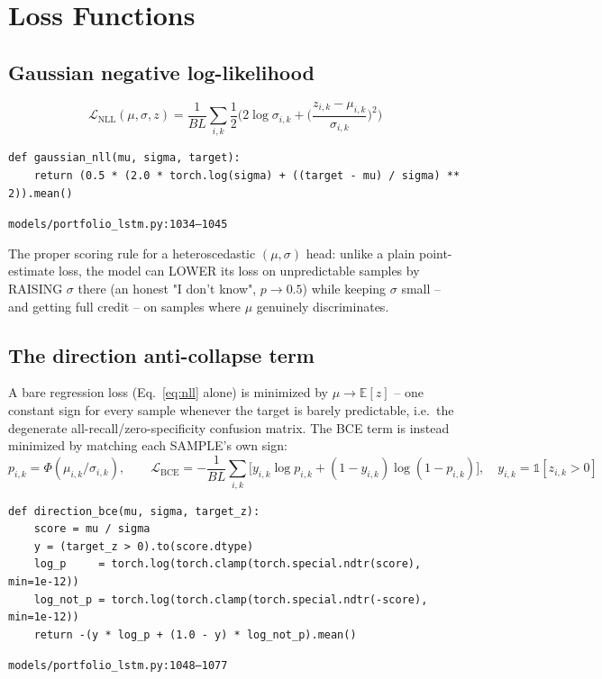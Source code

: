 \documentclass[11pt]{article}
\newcommand{\srcref}[1]{\hfill\textcolor{cmtcolor}{\footnotesize\texttt{#1}}}
\begin{document}
\section{Loss Functions}
\label{sec:losses}

\subsection{Gaussian negative log-likelihood}

\begin{equation}
  \mathcal{L}_{\text{NLL}}(\mu,\sigma,z) = \frac{1}{BL}\sum_{i,k} \frac{1}{2}\Big(2\log\sigma_{i,k} + \Big(\frac{z_{i,k}-\mu_{i,k}}{\sigma_{i,k}}\Big)^{\!2}\Big)
  \label{eq:nll}
\end{equation}
\begin{lstlisting}[caption={Gaussian NLL - the constant $\log 2\pi$ term is dropped (doesn't affect gradients).}, label=lst:nll]
def gaussian_nll(mu, sigma, target):
    return (0.5 * (2.0 * torch.log(sigma) + ((target - mu) / sigma) ** 2)).mean()
\end{lstlisting}
\srcref{models/portfolio\_lstm.py:1034--1045}

The proper scoring rule for a heteroscedastic $(\mu,\sigma)$ head: unlike a plain
point-estimate loss, the model can LOWER its loss on unpredictable samples by RAISING
$\sigma$ there (an honest "I don't know", $p\to 0.5$) while keeping $\sigma$ small -- and
getting full credit -- on samples where $\mu$ genuinely discriminates.

\subsection{The direction anti-collapse term}

A bare regression loss (Eq.~\ref{eq:nll} alone) is minimized by $\mu \to \mathbb{E}[z]$ -- one
constant sign for every sample whenever the target is barely predictable, i.e.\ the
degenerate all-recall/zero-specificity confusion matrix. The BCE term is instead minimized
by matching each SAMPLE's own sign:
\begin{equation}
  p_{i,k} = \Phi(\mu_{i,k} / \sigma_{i,k}), \qquad
  \mathcal{L}_{\text{BCE}} = -\frac{1}{BL}\sum_{i,k} \Big[ y_{i,k}\log p_{i,k} + (1-y_{i,k})\log(1-p_{i,k}) \Big], \quad y_{i,k}=\mathbb{1}[z_{i,k}>0]
  \label{eq:bce}
\end{equation}
\begin{lstlisting}[caption={Direction BCE, via ndtr (NOT log\_ndtr - see the note below).}, label=lst:bce]
def direction_bce(mu, sigma, target_z):
    score = mu / sigma
    y = (target_z > 0).to(score.dtype)
    log_p     = torch.log(torch.clamp(torch.special.ndtr(score),  min=1e-12))
    log_not_p = torch.log(torch.clamp(torch.special.ndtr(-score), min=1e-12))
    return -(y * log_p + (1.0 - y) * log_not_p).mean()
\end{lstlisting}
\srcref{models/portfolio\_lstm.py:1048--1077}
\end{document}

